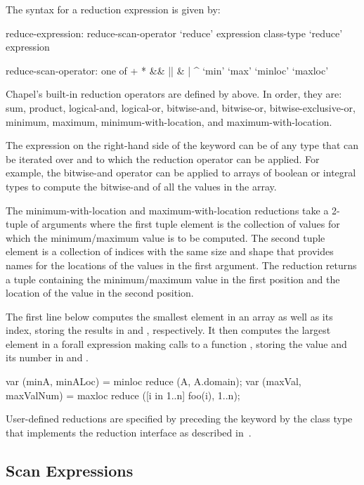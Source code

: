 The syntax for a reduction expression is given by:
\begin{syntax}
reduce-expression:
  reduce-scan-operator `reduce' expression
  class-type `reduce' expression

reduce-scan-operator: one of
  + * && || & | ^ `min' `max' `minloc' `maxloc'
\end{syntax}

Chapel's built-in reduction operators are defined
by  above.  In order, they are: sum,
product, logical-and, logical-or, bitwise-and, bitwise-or,
bitwise-exclusive-or, minimum, maximum, minimum-with-location, and
maximum-with-location.

The expression on the right-hand side of the  keyword
can be of any type that can be iterated over and to which the
reduction operator can be applied.  For example, the bitwise-and
operator can be applied to arrays of boolean or integral types to
compute the bitwise-and of all the values in the array.

The minimum-with-location and maximum-with-location reductions take a
2-tuple of arguments where the first tuple element is the collection
of values for which the minimum/maximum value is to be computed.  The
second tuple element is a collection of indices with the same size and
shape that provides names for the locations of the values in the first
argument.  The reduction returns a tuple containing the
minimum/maximum value in the first position and the location of the
value in the second position.

\begin{example}
The first line below computes the smallest element in an array
 as well as its index, storing the results in  and
, respectively.  It then computes the largest element in
a forall expression making calls to a function , storing
the value and its number in  and .
\begin{chapel}
var (minA, minALoc) = minloc reduce (A, A.domain); 
var (maxVal, maxValNum) = maxloc reduce ([i in 1..n] foo(i), 1..n);
\end{chapel}
\end{example}

User-defined reductions are specified by preceding the
keyword  by the class type that implements the reduction
interface as described in~.

\subsection{Scan Expressions}
\label{scan}

